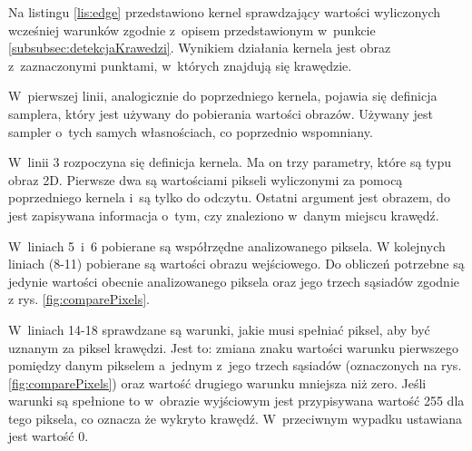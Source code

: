 Na listingu \ref{lis:edge} przedstawiono kernel sprawdzający wartości wyliczonych wcześniej warunków zgodnie z~opisem przedstawionym w~punkcie \ref{subsubsec:detekcjaKrawedzi}. Wynikiem działania kernela jest obraz z~zaznaczonymi punktami, w~których znajdują się krawędzie.

W~pierwszej linii, analogicznie do poprzedniego kernela, pojawia się definicja samplera, który jest używany do pobierania wartości obrazów. Używany jest sampler o~tych samych własnościach, co poprzednio wspomniany.

W~linii 3 rozpoczyna się definicja kernela. Ma on trzy parametry, które są typu obraz 2D. Pierwsze dwa są wartościami pikseli wyliczonymi za pomocą poprzedniego kernela i~są tylko do odczytu. Ostatni argument jest obrazem, do jest zapisywana informacja o~tym, czy znaleziono w~danym miejscu krawędź.

W~liniach 5~i~6 pobierane są współrzędne analizowanego piksela. W kolejnych liniach (8-11) pobierane są wartości obrazu wejściowego. Do obliczeń potrzebne są jedynie wartości obecnie analizowanego piksela oraz jego trzech sąsiadów zgodnie z rys. \ref{fig:comparePixels}.

W~liniach 14-18 sprawdzane są warunki, jakie musi spełniać piksel, aby być uznanym za piksel krawędzi. Jest to: zmiana znaku wartości warunku pierwszego pomiędzy danym pikselem a~jednym z~jego trzech sąsiadów (oznaczonych na rys. \ref{fig:comparePixels}) oraz wartość drugiego warunku mniejsza niż zero. Jeśli warunki są spełnione to w~obrazie wyjściowym jest przypisywana wartość 255 dla tego piksela, co oznacza że wykryto krawędź. W~przeciwnym wypadku ustawiana jest wartość 0.
